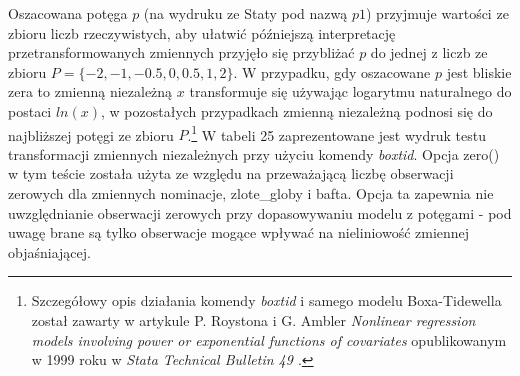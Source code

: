 Oszacowana potęga $p$ (na wydruku ze Staty pod nazwą $p1$) przyjmuje wartości ze zbioru liczb rzeczywistych, aby ułatwić późniejszą interpretację przetransformowanych zmiennych przyjęło się przybliżać $p$ do jednej z liczb ze zbioru $ P = \{-2,-1,-0.5,0,0.5,1,2\}$. W przypadku, gdy oszacowane $p$ jest bliskie zera to zmienną niezależną $x$ transformuje się używając logarytmu naturalnego do postaci $ln(x)$, w pozostałych przypadkach zmienną niezależną podnosi się do najbliższej potęgi ze zbioru $P$.\footnote{ Szczegółowy opis działania komendy \textit{boxtid} i samego modelu Boxa-Tidewella został zawarty w artykule P. Roystona i G. Ambler \textit{Nonlinear regression models involving power or exponential functions of covariates} opublikowanym w 1999 roku w \textit{Stata Technical Bulletin 49 \cite{royston99}}.} W tabeli 25 zaprezentowane jest wydruk testu transformacji zmiennych niezależnych przy użyciu komendy \textit{boxtid}. Opcja zero() w tym teście została użyta ze względu na przeważającą liczbę obserwacji zerowych dla zmiennych nominacje, zlote_globy i bafta. Opcja ta zapewnia nie uwzględnianie obserwacji zerowych przy dopasowywaniu modelu z potęgami - pod uwagę brane są tylko obserwacje mogące wpływać na nieliniowość zmiennej objaśniającej.


